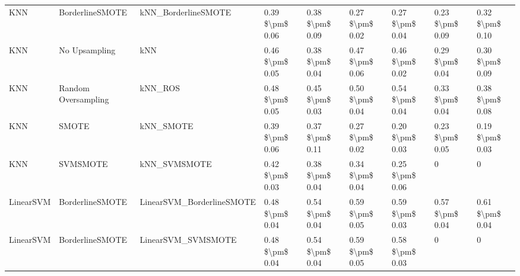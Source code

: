 \begin{tabular}{lllllllll}
                            KNN &               BorderlineSMOTE &                          kNN\_BorderlineSMOTE & 0.39 \$\textbackslash pm\$ 0.06 &           0.38 \$\textbackslash pm\$ 0.09 &       0.27 \$\textbackslash pm\$ 0.02 &        0.27 \$\textbackslash pm\$ 0.04 &                         0.23 \$\textbackslash pm\$ 0.09 &     0.32 \$\textbackslash pm\$ 0.10 \\
                            KNN &                 No Upsampling &                                          kNN & 0.46 \$\textbackslash pm\$ 0.05 &           0.38 \$\textbackslash pm\$ 0.04 &       0.47 \$\textbackslash pm\$ 0.06 &        0.46 \$\textbackslash pm\$ 0.02 &                         0.29 \$\textbackslash pm\$ 0.04 &     0.30 \$\textbackslash pm\$ 0.09 \\
                            KNN &           Random Oversampling &                                      kNN\_ROS & 0.48 \$\textbackslash pm\$ 0.05 &           0.45 \$\textbackslash pm\$ 0.03 &       0.50 \$\textbackslash pm\$ 0.04 &        0.54 \$\textbackslash pm\$ 0.04 &                         0.33 \$\textbackslash pm\$ 0.04 &     0.38 \$\textbackslash pm\$ 0.08 \\
                            KNN &                         SMOTE &                                    kNN\_SMOTE & 0.39 \$\textbackslash pm\$ 0.06 &           0.37 \$\textbackslash pm\$ 0.11 &       0.27 \$\textbackslash pm\$ 0.02 &        0.20 \$\textbackslash pm\$ 0.03 &                         0.23 \$\textbackslash pm\$ 0.05 &     0.19 \$\textbackslash pm\$ 0.03 \\
                            KNN &                      SVMSMOTE &                                 kNN\_SVMSMOTE & 0.42 \$\textbackslash pm\$ 0.03 &           0.38 \$\textbackslash pm\$ 0.04 &       0.34 \$\textbackslash pm\$ 0.04 &        0.25 \$\textbackslash pm\$ 0.06 &                                       0 &                   0 \\
                      LinearSVM &               BorderlineSMOTE &                    LinearSVM\_BorderlineSMOTE & 0.48 \$\textbackslash pm\$ 0.04 &           0.54 \$\textbackslash pm\$ 0.04 &       0.59 \$\textbackslash pm\$ 0.05 &        0.59 \$\textbackslash pm\$ 0.03 &                         0.57 \$\textbackslash pm\$ 0.04 &     0.61 \$\textbackslash pm\$ 0.04 \\
                      LinearSVM &               BorderlineSMOTE &                           LinearSVM\_SVMSMOTE & 0.48 \$\textbackslash pm\$ 0.04 &           0.54 \$\textbackslash pm\$ 0.04 &       0.59 \$\textbackslash pm\$ 0.05 &        0.58 \$\textbackslash pm\$ 0.03 &                                       0 &                   0 \\

\end{tabular}
